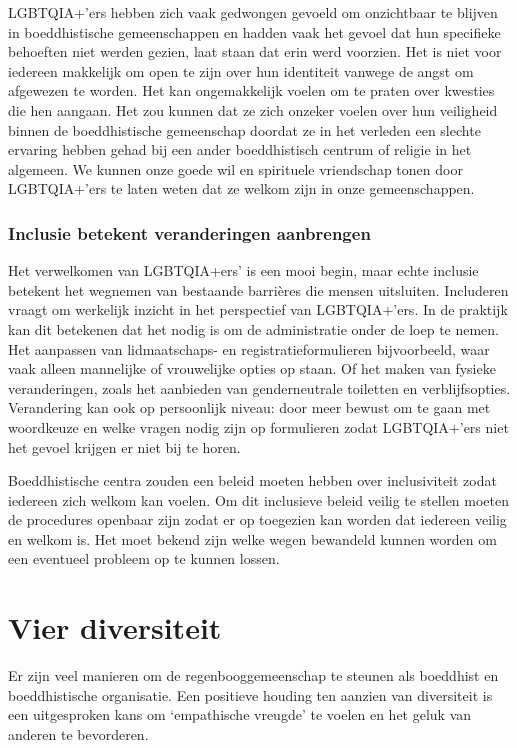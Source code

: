 \documentclass[12pt,openany]{book}
\begin{document}
LGBTQIA+'ers hebben zich vaak gedwongen gevoeld om onzichtbaar te blijven in boeddhistische gemeenschappen en hadden vaak het gevoel dat hun specifieke behoeften niet werden gezien, laat staan dat erin werd voorzien.  Het is niet voor iedereen makkelijk om open te zijn over hun identiteit vanwege de angst om afgewezen te worden. Het kan ongemakkelijk voelen om te praten over kwesties die hen aangaan. Het zou kunnen dat ze zich onzeker voelen over hun veiligheid binnen de boeddhistische gemeenschap doordat ze in het verleden een slechte ervaring hebben gehad bij een ander boeddhistisch centrum of religie in het algemeen. We kunnen onze goede wil en spirituele vriendschap tonen door LGBTQIA+'ers te laten weten dat ze welkom zijn in onze gemeenschappen.

\subsubsection*{Inclusie betekent veranderingen aanbrengen}

Het verwelkomen van LGBTQIA+ers' is een mooi begin, maar echte inclusie betekent het wegnemen van bestaande barrières die mensen uitsluiten. Includeren vraagt om werkelijk inzicht in het perspectief van LGBTQIA+'ers. In de praktijk kan dit betekenen dat het nodig is om de administratie onder de loep te nemen. Het aanpassen van lidmaatschaps- en registratieformulieren bijvoorbeeld, waar vaak alleen mannelijke of vrouwelijke opties op staan. Of het maken van fysieke veranderingen, zoals het aanbieden van genderneutrale toiletten en verblijfsopties.  Verandering kan ook op persoonlijk niveau: door meer bewust om te gaan met woordkeuze en welke vragen nodig zijn op formulieren zodat LGBTQIA+'ers niet het gevoel krijgen er niet bij te horen.

Boeddhistische centra zouden een beleid moeten hebben over inclusiviteit zodat iedereen zich welkom kan voelen. Om dit inclusieve beleid veilig te stellen moeten de procedures openbaar zijn zodat er op toegezien kan worden dat iedereen veilig en welkom is. Het moet bekend zijn welke wegen bewandeld kunnen worden om een eventueel probleem op te kunnen lossen.

\section*{Vier diversiteit} 

Er zijn veel manieren om de regenbooggemeenschap te steunen als boeddhist en boeddhistische organisatie. Een positieve houding ten aanzien van diversiteit is een uitgesproken kans om `empathische vreugde' te voelen en het geluk van anderen te bevorderen.
\end{document}

